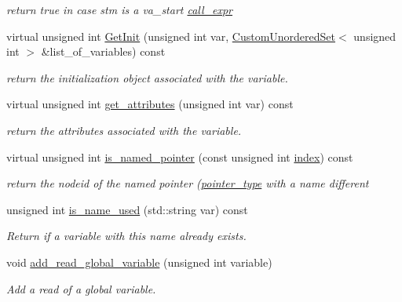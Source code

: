 \begin{DoxyCompactItemize}
\begin{DoxyCompactList}\small\item\em return true in case stm is a va\+\_\+start \hyperlink{structcall__expr}{call\+\_\+expr} \end{DoxyCompactList}\item 
virtual unsigned int \hyperlink{classBehavioralHelper_a60ede8d00944093fe896d3d24c4f3426}{Get\+Init} (unsigned int var, \hyperlink{classCustomUnorderedSet}{Custom\+Unordered\+Set}$<$ unsigned int $>$ \&list\+\_\+of\+\_\+variables) const
\begin{DoxyCompactList}\small\item\em return the initialization object associated with the variable. \end{DoxyCompactList}\item 
virtual unsigned int \hyperlink{classBehavioralHelper_afb4630e8cd200f2989772d688b388632}{get\+\_\+attributes} (unsigned int var) const
\begin{DoxyCompactList}\small\item\em return the attributes associated with the variable. \end{DoxyCompactList}\item 
virtual unsigned int \hyperlink{classBehavioralHelper_a599b68e8bc619c214160051c6e931bec}{is\+\_\+named\+\_\+pointer} (const unsigned int \hyperlink{tutorial__pact__2019_2Introduction_2third_2include_2Keccak_8h_a028c9bdc8344cca38ab522a337074797}{index}) const
\begin{DoxyCompactList}\small\item\em return the nodeid of the named pointer (\hyperlink{structpointer__type}{pointer\+\_\+type} with a name different \end{DoxyCompactList}\item 
unsigned int \hyperlink{classBehavioralHelper_afc5180b10e4bf31167ea60c00d30361a}{is\+\_\+name\+\_\+used} (std\+::string var) const
\begin{DoxyCompactList}\small\item\em Return if a variable with this name already exists. \end{DoxyCompactList}\item 
void \hyperlink{classBehavioralHelper_a5baec628b0fbeaf1372ad2b2297f5e78}{add\+\_\+read\+\_\+global\+\_\+variable} (unsigned int variable)
\begin{DoxyCompactList}\small\item\em Add a read of a global variable. \end{DoxyCompactList}\item 

\end{DoxyCompactItemize}
